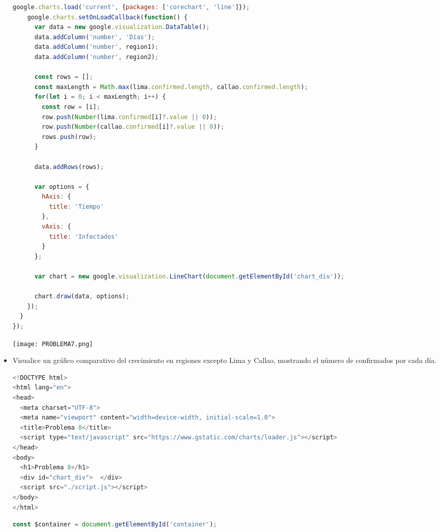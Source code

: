 \documentclass{article}
\begin{document}
\begin{itemize}
\begin{lstlisting}[language=JavaScript, caption=PROBLEMA7-SCRIPT]
    google.charts.load('current', {packages: ['corechart', 'line']});
    google.charts.setOnLoadCallback(function() {
      var data = new google.visualization.DataTable();
      data.addColumn('number', 'Días');
      data.addColumn('number', region1);
      data.addColumn('number', region2);

      const rows = [];
      const maxLength = Math.max(lima.confirmed.length, callao.confirmed.length);
      for(let i = 0; i < maxLength; i++) {
        const row = [i];
        row.push(Number(lima.confirmed[i]?.value || 0));
        row.push(Number(callao.confirmed[i]?.value || 0));
        rows.push(row);
      }

      data.addRows(rows);

      var options = {
        hAxis: {
          title: 'Tiempo'
        },
        vAxis: {
          title: 'Infectados'
        }
      };

      var chart = new google.visualization.LineChart(document.getElementById('chart_div'));

      chart.draw(data, options);
    });
  }
});
            \end{lstlisting}  

            \newline \newline \newline
            \texttt{[image: PROBLEMA7.png]}
            \newline \newline \newline

            \item Visualice un gráfico comparativo del crecimiento en regiones excepto Lima y Callao, mostrando el número de confirmados por cada día.
            
            \begin{lstlisting}[language=JavaScript, caption=PROBLEMA8-INDEX]
<!DOCTYPE html>
<html lang="en">
<head>
  <meta charset="UTF-8">
  <meta name="viewport" content="width=device-width, initial-scale=1.0">
  <title>Problema 8</title>
  <script type="text/javascript" src="https://www.gstatic.com/charts/loader.js"></script>
</head>
<body>
  <h1>Problema 8</h1>
  <div id="chart_div">  </div>
  <script src="./script.js"></script>
</body>
</html>
            \end{lstlisting}  

            \begin{lstlisting}[language=JavaScript, caption=PROBLEMA8-SCRIPT]
const $container = document.getElementById('container');


\end{lstlisting}
\end{itemize}
\end{document}
